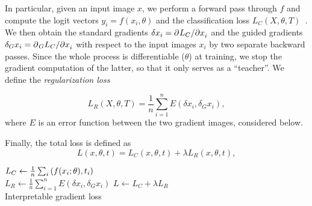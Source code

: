 In particular, given an input image $x$, we perform a forward pass through $f$ and compute the 
logit vectors $y_i = f(x_i, \theta)$ and the classification loss $L_C(X, \theta, T)$~. 
We then obtain the standard gradients $\delta x_i = \partial^{}{L_C}/\partial{x_i^{}}$ and the guided gradients 
$\delta_G x_i = \partial^{}{_G L_C}/\partial{x_i^{}}$ with respect to the input images $x_i$ by two separate 
backward passes. Since the whole process is differentiable (\wrt $\theta$) at training, we stop 
the gradient computation of the latter, so that it only serves as a ``teacher''. We define 
the \emph{regularization loss} 

\begin{equation}
	L_R(X, \theta, T) = \frac{1}{n} \sum_{i=1}^n E(\delta x_i, \delta_G x_i),
\label{eq:reg}
\end{equation}
where $E$ is an error function between the two gradient images, considered below.

Finally, the total loss is defined as
\begin{equation}
	L(x, \theta, t) = L_C(x, \theta, t) + \lambda L_R(x, \theta, t),
\label{eq:total}
\end{equation}



\begin{algorithm}[t]    
	\newcommand{\commentsty}[1]{{\color{DarkGreen}#1}}


	$L_C \gets \frac{1}{n} \sum_i \ce(f(x_i; \theta), t_i)$  \\
   $L_R \gets \frac{1}{n} \sum_{i=1}^n E(\delta x_i, \delta_G x_i) $ 
 $L \gets L_C + \lambda L_R$
  \\

\caption{Interpretable gradient loss}
\label{alg:grad}
\end{algorithm}

